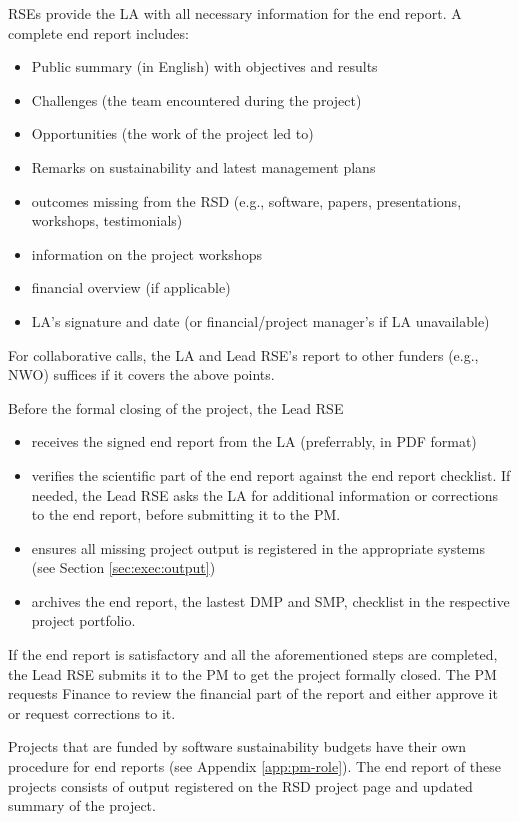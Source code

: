 RSEs provide the LA with all necessary information for the end report.%
A complete end report includes:
\begin{itemize}
\item Public summary (in English) with objectives and results
\item Challenges (the team encountered during the project)
\item Opportunities (the work of the project led to)
\item Remarks on sustainability and latest management plans
\item outcomes missing from the RSD (e.g., software, papers, presentations, workshops, testimonials)
\item information on the project workshops
\item financial overview (if applicable)
\item LA's signature and date (or financial/project manager's if LA unavailable)
\end{itemize}
For collaborative calls, the LA and Lead RSE's report to other funders (e.g., NWO) suffices if it covers the above points.

Before the formal closing of the project, the Lead RSE 
\begin{itemize}
   \item receives the signed end report from the LA (preferrably, in PDF format)
   \item verifies the scientific part of the end report against the end report checklist. If needed, the Lead RSE asks the LA for additional information or corrections to the end report, before submitting it to the PM. 
   \item ensures all missing project output is registered in the appropriate systems (see Section \ref{sec:exec:output}) 
   \item archives the end report, the lastest DMP and SMP, checklist in the respective project portfolio.
\end{itemize}
If the end report is satisfactory and all the aforementioned steps are completed, the Lead RSE submits it to the PM to get the project formally closed. The PM requests Finance to review the financial 
part of the report and either approve it or request corrections to it. 

Projects that are funded by software sustainability budgets have their own procedure for end reports (see Appendix
\ref{app:pm-role}). The end report of these projects consists of output registered on the RSD project page and
updated summary of the project.

